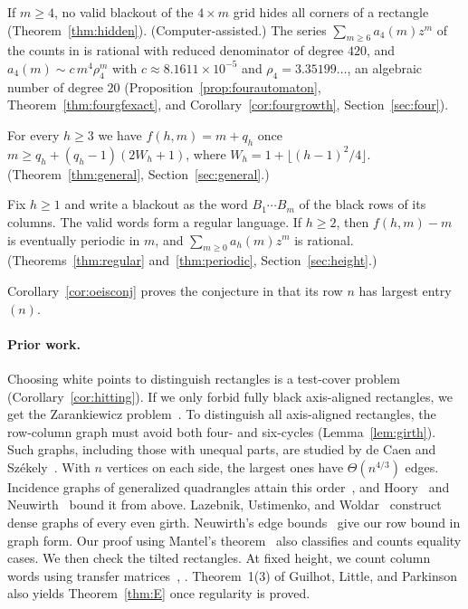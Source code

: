 \begin{introthm}\label{thm:C}
If $m\ge4$, no valid blackout of the $4\times m$ grid hides all corners of a
rectangle \textup{(Theorem~\ref{thm:hidden})}. (Computer-assisted.) The series
$\sum_{m\ge6}a_4(m)z^m$ of the counts in  is rational with reduced denominator of degree $420$, and
$a_4(m)\sim c\,m^4\rho_4^m$ with $c\approx8.1611\times10^{-5}$ and $\rho_4=3.35199\ldots$, an
algebraic number of degree $20$ \textup{(Proposition~\ref{prop:fourautomaton},
Theorem~\ref{thm:fourgfexact}, and Corollary~\ref{cor:fourgrowth}, Section~\ref{sec:four})}.
\end{introthm}

\begin{introthm}\label{thm:D}
For every $h\ge3$ we have $f(h,m)=m+q_h$ once $m\ge q_h+(q_h-1)(2W_h+1)$, where
$W_h=1+\lfloor(h-1)^2/4\rfloor$. \textup{(Theorem~\ref{thm:general},
Section~\ref{sec:general}.)}
\end{introthm}

\begin{introthm}\label{thm:E}
Fix $h\ge1$ and write a blackout as the word $B_1\cdots B_m$ of the black rows of its
columns. The valid words form a regular language. If $h\ge2$, then $f(h,m)-m$ is
eventually periodic in $m$, and $\sum_{m\ge0}a_h(m)z^m$ is rational.
\textup{(Theorems~\ref{thm:regular} and~\ref{thm:periodic}, Section~\ref{sec:height}.)}
\end{introthm}

Corollary~\ref{cor:oeisconj} proves the conjecture in  that its row $n$ has
largest entry $(n)$.

\paragraph{Prior work.} Choosing white points to distinguish rectangles is
a test-cover problem~\cite{bellitto2018,foucaud2015,katona1966,moretshapiro1985}
(Corollary~\ref{cor:hitting}). If we only forbid fully black axis-aligned
rectangles, we get the Zarankiewicz problem~\cite{furedi1996,kst1954,reiman1958}.
To distinguish all axis-aligned rectangles, the row-column graph must
avoid both four- and six-cycles (Lemma~\ref{lem:girth}). Such graphs,
including those with unequal parts, are studied by de Caen and
Sz\'ekely~\cite{decaenszekely1992,decaenszekely1997}. With $n$ vertices on each
side, the largest ones have $\Theta(n^{4/3})$ edges. Incidence graphs of generalized
quadrangles attain this order~\cite{benson1966}, and Hoory~\cite{hoory2002} and
Neuwirth~\cite{neuwirth2001} bound it from above. Lazebnik, Ustimenko, and
Woldar~\cite{lazebnik1995} construct dense graphs of every even girth.
Neuwirth's edge bounds~\cite[Theorem~1(ii) and Proposition~17]{neuwirth2001}
give our row bound in graph form. Our proof using Mantel's theorem~\cite{mantel1907}
also classifies and counts equality cases. We then check the tilted rectangles.
At fixed height, we count column words using transfer
matrices~\cite{alanko2011,euler2005,mertens2024},
\cite[Proposition~V.6]{flajolet2009}.
Theorem~1(3) of Guilhot, Little, and Parkinson~\cite{glp2025} also
yields Theorem~\ref{thm:E} once regularity is proved.

